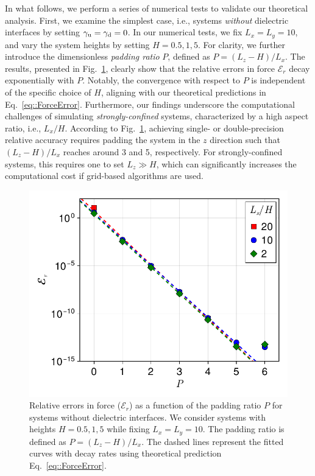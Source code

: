 In what follows, we perform a series of numerical tests to validate our theoretical analysis. 
First, we examine the simplest case, i.e., systems \emph{without} dielectric interfaces by setting $\gamma_{\text{u}} = \gamma_{\text{d}} = 0$. 
In our numerical tests, we fix $L_x = L_y = 10$, and vary the system heights by setting $H = 0.5, 1, 5$. 
For clarity, we further introduce the dimensionless \emph{padding ratio} $P$, defined as $P = (L_z - H) / L_x$. 
The results, presented in Fig.~\ref{fig:elc_error_force}, clearly show that the relative errors in force $\mathcal{E}_r$ decay exponentially with $P$. 
Notably, the convergence with respect to $P$ is independent of the specific choice of $H$, aligning with our theoretical predictions in Eq.~\eqref{eq::ForceError}. 
Furthermore, our findings underscore the computational challenges of simulating \emph{strongly-confined} systems, characterized by a high aspect ratio, i.e., $L_x / H$. 
According to Fig.~\ref{fig:elc_error_force}, achieving single- or double-precision relative accuracy requires padding the system in the $z$ direction such that $(L_z - H)/L_x$ reaches around 3 and 5, respectively. For strongly-confined systems, this requires one to set $L_z\gg H$, which can significantly increases the computational cost if grid-based algorithms are used.

\begin{figure}[htbp]
    \centering
    \includegraphics[width=0.55\linewidth]{figs/elc_error_force.pdf}
    \caption{Relative errors in force ($\mathcal{E}_r$) as a function of the padding ratio $P$ for systems without dielectric interfaces. 
    We consider systems with heights $H = 0.5, 1, 5$ while fixing $L_x=L_y=10$. The padding ratio is defined as $P = (L_z - H) / L_x$. The dashed lines represent the fitted curves with decay rates using theoretical prediction Eq.~\eqref{eq::ForceError}. }
    \label{fig:elc_error_force}
\end{figure}

